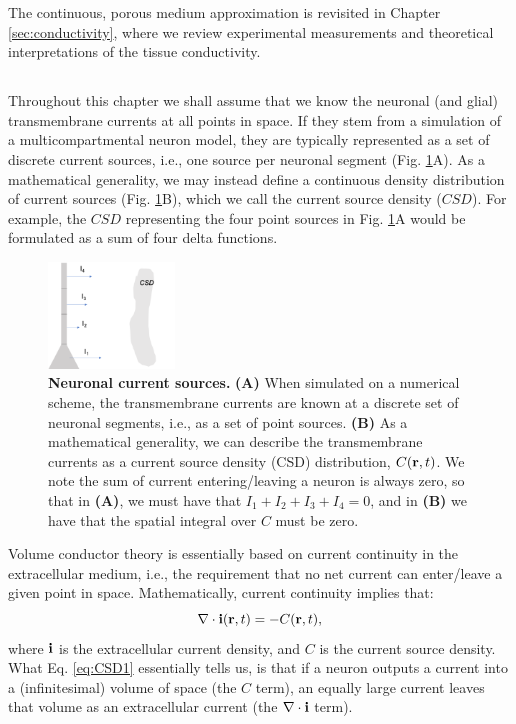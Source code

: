 The continuous, porous medium approximation is revisited in Chapter \ref{sec:conductivity}, where we review experimental measurements and theoretical interpretations of the tissue conductivity.


\subsection{}
\label{sec:continuous}
Throughout this chapter we shall assume that we know the neuronal (and glial) transmembrane currents at all points in space. If they stem from a simulation of a multicompartmental neuron model, they are typically represented as a set of discrete current sources, i.e., one source per neuronal segment (Fig. \ref{VC:fig:CSD}A). As a mathematical generality, we may instead define a continuous density distribution of current sources (Fig. \ref{VC:fig:CSD}B), which we call the current source density ($CSD$). For example, the $CSD$ representing the four point sources in Fig. \ref{VC:fig:CSD}A would be formulated as a sum of four delta functions. 

\begin{figure}[!ht]
\begin{center}
\includegraphics[width=0.3\textwidth]{Figures/VC/CSD.png}
\end{center}
\caption{\textbf{Neuronal current sources.}  {\bf (A)} When simulated on a numerical scheme, the transmembrane currents are known at a discrete set of neuronal segments, i.e., as a set of point sources.  {\bf (B)} As a mathematical generality, we can describe the transmembrane currents as a current source density (CSD) distribution, $C({\bf r},t)$. We note the sum of current entering/leaving a neuron is always zero, so that in {\bf (A)}, we must have that $I_1 + I_2 + I_3 + I_4 = 0$, and in {\bf (B)} we have that the spatial integral over $C$ must be zero.
}
\label{VC:fig:CSD}
\end{figure}
Volume conductor theory is essentially based on current continuity in the extracellular medium, i.e., the requirement that no net current can enter/leave a given point in space. Mathematically, current continuity implies that:
\begin{equation}
\nabla \cdot {\bf i}({\bf r}, t) = - C({\bf r}, t),
\label{eq:CSD1}
\end{equation}
where ${\bf i}$ is the extracellular current density, and $C$ is the current source density. What Eq. \ref{eq:CSD1} essentially tells us, is that if a neuron outputs a current into a (infinitesimal) volume of space (the $C$ term), an equally large current leaves that volume as an extracellular current (the $\nabla \cdot {\bf i}$ term).


